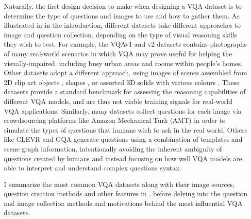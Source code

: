 Naturally, the first design decision to make when designing a VQA dataset is to determine the type of questions and images to use and how to gather them. As illustrated in \figureautorefname{ \ref{fig:dataset_samples}} in the introduction, different datasets take different approaches to image and question collection, depending on the type of visual reasoning skills they wish to test. For example, the VQAv1 \cite{antol2015vqa} and v2 \cite{goyal2017making} datasets contains photographs of many real-world  scenarios in which VQA may prove useful for helping the visually-impaired, including busy urban areas and rooms within people's homes. Other datasets adopt a different approach, using images of scenes assembled from 2D clip art objects \cite{zitnick2013bringing, antol2015vqa}, shapes \cite{andreas2016neural}, or assorted 3D solids with various colours \cite{johnson2017clevr}. These datasets provide a standard benchmark for assessing the reasoning capabilities of different VQA models, and are thus not viable training signals for real-world VQA applications. Similarly, many datasets collect questions for each image via crowdsourcing platforms like Amazon Mechanical Turk (AMT) in order to simulate the types of questions that humans wish to ask in the real world. Others like CLEVR \cite{johnson2017clevr} and GQA \cite{hudson2019gqa} generate questions using a combination of templates and scene graph information, intentionally avoiding the inherent ambiguity of questions created by humans and instead focusing on how well VQA models are able to interpret and understand complex questions syntax.

I summarise the most common VQA datasets along with their image sources, question creation methods and other features in \tableautorefname{ \ref{tab:dataset_comparison}}, before delving into the question and image collection methods and motivations behind the most influential VQA datasets.



